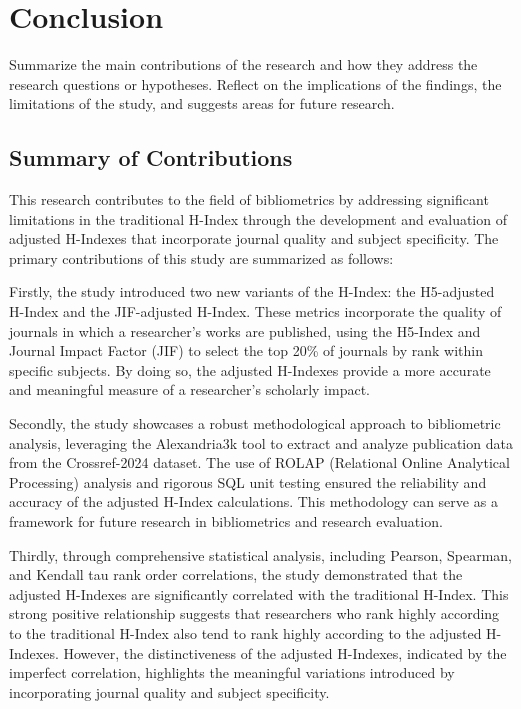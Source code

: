 \chapter{Conclusion}
\label{ch:conclusion}

Summarize the main contributions of the research and how they address the
research questions or hypotheses. Reflect on the implications of the findings,
the limitations of the study, and suggests areas for future research.

\section{Summary of Contributions}

This research contributes to the field of bibliometrics by addressing
significant limitations in the traditional H-Index through the development and
evaluation of adjusted H-Indexes that incorporate journal quality and subject
specificity. The primary contributions of this study are summarized as follows:

Firstly, the study introduced two new variants of the H-Index: the H5-adjusted
H-Index and the JIF-adjusted H-Index. These metrics incorporate the quality of
journals in which a researcher's works are published, using the H5-Index and
Journal Impact Factor (JIF) to select the top 20\% of journals by rank within
specific subjects. By doing so, the adjusted H-Indexes provide a more accurate
and meaningful measure of a researcher's scholarly impact.

Secondly, the study showcases a robust methodological approach to bibliometric
analysis, leveraging the Alexandria3k tool to extract and analyze publication
data from the Crossref-2024 dataset. The use of ROLAP (Relational Online
Analytical Processing) analysis and rigorous SQL unit testing ensured the
reliability and accuracy of the adjusted H-Index calculations. This methodology
can serve as a framework for future research in bibliometrics and research
evaluation.

Thirdly, through comprehensive statistical analysis, including Pearson,
Spearman, and Kendall tau rank order correlations, the study demonstrated that
the adjusted H-Indexes are significantly correlated with the traditional
H-Index. This strong positive relationship suggests that researchers who rank
highly according to the traditional H-Index also tend to rank highly according
to the adjusted H-Indexes. However, the distinctiveness of the adjusted
H-Indexes, indicated by the imperfect correlation, highlights the meaningful
variations introduced by incorporating journal quality and subject specificity.

